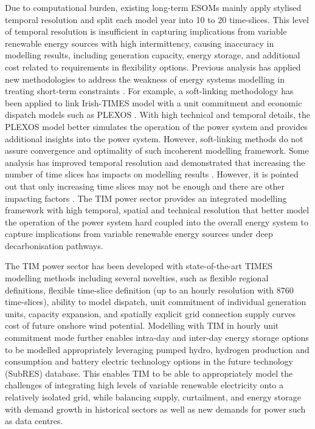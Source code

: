 \documentclass[journal abbreviation, manuscript]{copernicus}
\begin{document}
Due to computational burden, existing long-term ESOMs mainly apply stylised temporal resolution and split each model year into 10 to 20 time-slices. This level of temporal resolution is insufficient in capturing implications from variable renewable energy sources with high intermittency, causing inaccuracy in modelling results, including generation capacity, energy storage, and additional cost related to requirements in flexibility options. Previous analysis has applied new methodologies to address the weakness of energy systems modelling in treating short-term constraints \citep{Collins2017}. For example, a soft-linking methodology has been applied to link Irish-TIMES model with a unit commitment and economic dispatch models such as PLEXOS \citep{Deane2012}. With high technical and temporal details, the PLEXOS model better simulates the operation of the power system and provides additional insights into the power system. However, soft-linking methods do not assure convergence and optimality of such incoherent modelling framework. Some analysis has improved temporal resolution and demonstrated that increasing the number of time slices has impacts on modelling results \citep{Pina2011,Kannan2013,Gaur2019}. However, it is pointed out that only increasing time slices may not be enough and there are other impacting factors \citep{Poncelet2016}. The TIM power sector provides an integrated modelling framework with high temporal, spatial and technical resolution that better model the operation of the power system hard coupled into the overall energy system to capture implications from variable renewable energy sources under deep decarbonisation pathways. 

The TIM power sector has been developed with state-of-the-art TIMES modelling methods including several novelties, such as flexible regional definitions, flexible time-slice definition (up to an hourly resolution with 8760 time-slices), ability to model dispatch, unit commitment of individual generation units, capacity expansion, and spatially explicit grid connection supply curves cost of future onshore wind potential. Modelling with TIM in hourly unit commitment mode further enables intra-day and inter-day energy storage options to be modelled appropriately leveraging pumped hydro, hydrogen production and consumption and battery electric technology options in the future technology (SubRES) database. This enables TIM to be able to appropriately model the challenges of integrating high levels of variable renewable electricity onto a relatively isolated grid, while balancing supply, curtailment, and energy storage with demand growth in historical sectors as well as new demands for power such as data centres.
\end{document}
